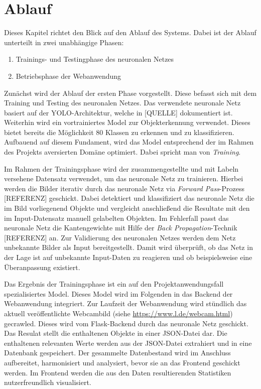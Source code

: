 \section{Ablauf}

Dieses Kapitel richtet den Blick auf den Ablauf des Systems. 
Dabei ist der Ablauf unterteilt in zwei unabhängige Phasen:

\begin{enumerate}
    \item Trainings- und Testingphase des neuronalen Netzes
    \item Betriebsphase der Webanwendung
\end{enumerate}

Zunächst wird der Ablauf der ersten Phase vorgestellt.
Diese befasst sich mit dem Training und Testing des neuronalen Netzes. 
Das verwendete neuronale Netz basiert auf der YOLO-Architektur, welche in [QUELLE] dokumentiert ist.
Weiterhin wird ein vortrainiertes Model zur Objekterkennung verwendet.
Dieses bietet bereits die Möglichkeit 80 Klassen zu erkennen und zu klassifizieren. 
Aufbauend auf diesem Fundament, wird das Model entsprechend der im Rahmen des Projekts aversierten Domäne optimiert.
Dabei spricht man von \textit{Training}.

Im Rahmen der Trainingsphase wird der zusammengestellte und mit Labeln versehene Datensatz verwendet, um 
das neuronale Netz zu trainieren. 
Hierbei werden die Bilder iterativ durch das neuronale Netz via \textit{Forward Pass}-Prozess [REFERENZ] geschickt.
Dabei detektiert und klassifiziert das neuronale Netz die im Bild vorliegenend Objekte und vergleicht anschließend
die Resultate mit den im Input-Datensatz manuell gelabelten Objekten.
Im Fehlerfall passt das neuronale Netz die Kantengewichte mit Hilfe der \textit{Back Propagation}-Technik [REFERENZ] an.
Zur Validierung des neuronalen Netzes werden dem Netz unbekannte Bilder als Input bereitgestellt.
Damit wird überprüft, ob das Netz in der Lage ist auf unbekannte Input-Daten zu reagieren und ob beispielsweise eine 
Überanpassung existiert.

Das Ergebnis der Trainingsphase ist ein auf den Projektanwendungsfall spezialisiertes Model.
Dieses Model wird im Folgenden in das Backend der Webanwendung integriert.
Zur Laufzeit der Webanwendung wird stündlich das aktuell veröffentlichte Webcambild (siehe \url{https://www.l.de/webcam.html}) gecrawled.
Dieses wird vom Flask-Backend durch das neuronale Netz geschickt. 
Das Resulat stellt die enthaltenen Objekte in einer JSON-Datei dar. 
Die enthaltenen relevanten Werte werden aus der JSON-Datei extrahiert und in eine Datenbank gespeichert.
Der gesammelte Datenbestand wird im Anschluss aufbereitet, harmonisiert und analysiert, bevor sie an das Frontend
geschickt werden.
Im Frontend werden die aus den Daten resultierenden Statistiken nutzerfreundlich visualisiert.
